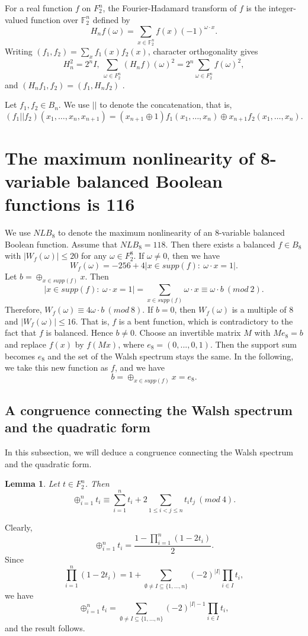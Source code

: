 \documentclass[11pt]{article}
\newtheorem{lemma}{Lemma}
\newtheorem{open problem}{Open problem}
\begin{document}
For a real function $f$ on $F_2^n$, the Fourier-Hadamard transform of $f$ is the integer-valued function over $\mathbb{F}_{2}^n$
defined by
\[
H_nf(\omega)=\sum_{x\in \mathbb{F}_{2}^n}f(x)(-1)^{\omega \cdot x}.
\]
Writing $(f_1,f_2)=\sum_{x}f_1(x)f_2(x)$, character orthogonality gives
\[
H_n^2=2^nI, \ \sum_{\omega\in F_2^n}(H_nf)(\omega)^2=2^n\sum_{\omega\in F_2^n}f(\omega)^2,
\]
and $(H_nf_1,f_2)=(f_1,H_nf_2)$ \cite{Car}.

Let $f_1,f_2\in B_n$. We use $||$ to denote the concatenation, that is,
\[
(f_1||f_2)(x_1,\ldots,x_n,x_{n+1})=(x_{n+1}\oplus 1)f_1(x_1,\ldots,x_n)\oplus x_{n+1}f_2(x_1,\ldots,x_n).
\]

 \section{The maximum nonlinearity of 8-variable balanced Boolean functions is 116}
We use $NLB_8$ to denote the maximum nonlinearity of an 8-variable balanced Boolean function. Assume that $NLB_8=118$. Then there exists a balanced $f\in B_8$ with $|W_f(\omega)|\le 20$ for any $\omega\in F_2^8$. If $\omega\neq 0$, then we have
\begin{equation}
 W_f(\omega)=-256+4|x\in supp(f): \ \omega \cdot x=1|.
\end{equation}
Let $b=\oplus_{x\in supp(f)} x$. Then
\[
|x\in supp(f) : \ \omega \cdot x=1|=\sum_{x\in supp(f)} \omega \cdot x\equiv\omega \cdot b\ (mod \ 2).
\]
Therefore, $W_f(\omega)\equiv 4\omega\cdot b \ (mod \ 8)$. If $b=0$, then $W_f(\omega)$ is a multiple of 8 and $|W_f(\omega)|\le 16$. That is, $f$ is a bent function, which is contradictory to the fact that $f$ is balanced. Hence $b\neq 0$. Choose an invertible matrix $M$ with $Me_8=b$ and replace $f(x)$ by $f(Mx)$, where $e_8=(0,...,0,1)$. Then the support sum becomes $e_8$ and the set of the Walsh spectrum stays the same. In the following, we take this new function as $f$, and we have
\[
b=\oplus_{x\in supp(f)} x=e_8.
\]
\subsection{A congruence connecting the Walsh spectrum and the quadratic form}
In this subsection, we will deduce a congruence connecting the Walsh spectrum and the quadratic form.
\begin{lemma} Let $t\in F_2^n$. Then
\[
\oplus_{i=1}^n t_i\equiv \sum_{i=1}^n t_i+2\sum_{1\le i<j\le n} t_it_j \ (mod \ 4).
\]
\end{lemma}
\proof Clearly,
\[
\oplus_{i=1}^n t_i=\frac{1-\prod_{i=1}^n(1-2t_i)}{2}.
\]
Since
\[
\prod_{i=1}^n(1-2t_i)=1+\sum_{\emptyset\neq I\subseteq\{1,...,n\}}(-2)^{|I|}\prod_{i\in I}t_i,
\]
we have
\[
\oplus_{i=1}^n t_i=\sum_{\emptyset\neq I\subseteq\{1,...,n\}}(-2)^{|I|-1}\prod_{i\in I}t_i,
\]
and the result follows.
\endproof
\end{document}
